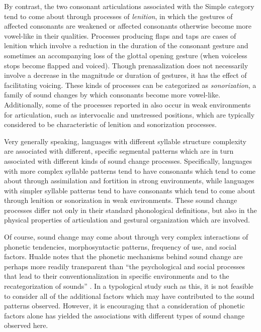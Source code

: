   By contrast, the two consonant articulations associated with the Simple category tend to come about through processes of \textit{lenition}, in which the gestures of affected consonants are weakened or affected consonants otherwise become more vowel-like in their qualities. Processes producing flaps and taps are cases of lenition which involve a reduction in the duration of the consonant gesture and sometimes an accompanying loss of the glottal opening gesture (when voiceless stops become flapped and voiced). Though prenasalization does not necessarily involve a decrease in the magnitude or duration of gestures, it has the effect of facilitating voicing. These kinds of processes can be categorized as \textit{sonorization}, a family of sound changes by which consonants become more vowel-like. Additionally, some of the processes reported in  also occur in weak environments for articulation, such as intervocalic and unstressed positions, which are typically considered to be characteristic of lenition and sonorization processes.

  Very generally speaking, languages with different syllable structure complexity are associated with different, specific segmental patterns which are in turn associated with different kinds of sound change processes. Specifically, languages with more complex syllable patterns tend to have consonants which tend to come about through assimilation and fortition in strong environments, while languages with simpler syllable patterns tend to have consonants which tend to come about through lenition or sonorization in weak environments. These sound change processes differ not only in their standard phonological definitions, but also in the physical properties of articulation and gestural organization which are involved.

  Of course, sound change may come about through very complex interactions of phonetic tendencies, morphosyntactic patterns, frequency of use, and social factors. Hualde notes that the phonetic mechanisms behind sound change are perhaps more readily transparent than “the psychological and social processes that lead to their conventionalization in specific environments and to the recategorization of sounds” \citep[2222]{Hualde2011}. In a typological study such as this, it is not feasible to consider all of the additional factors which may have contributed to the sound patterns observed. However, it is encouraging that a consideration of phonetic factors alone has yielded the associations with different types of sound change observed here.

